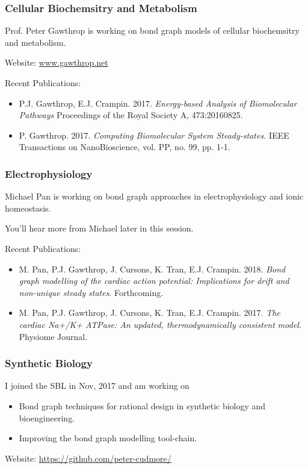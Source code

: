 \documentclass[11pt,reqno]{beamer}
\begin{document}
\begin{frame}
\frametitle{Cellular Biochemsitry and Metabolism}

Prof. Peter Gawthrop is working on bond graph models of cellular biochemsitry and metabolism.\\
\vspace{10pt}

Website: \url{www.gawthrop.net}
\vspace{10pt}

Recent Publications:
\begin{itemize}
	\itemsep1em
	\item  P.J. Gawthrop, E.J. Crampin. 2017. \emph{Energy-based Analysis of Biomolecular Pathways}
	Proceedings of the Royal Society A, 473:20160825.
	\item P. Gawthrop. 2017. \emph{Computing Biomolecular System Steady-states.}
	 IEEE Transactions on NanoBioscience, vol. PP, no. 99, pp. 1-1. 
\end{itemize}


\end{frame}
\begin{frame}
\frametitle{Electrophysiology}
Michael Pan is working on bond graph approaches in electrophysiology and ionic homeostasis. \\
\vspace{10pt}

You'll hear more from Michael later in this session.\\
\vspace{10pt}

Recent Publications:
\begin{itemize}
	\itemsep1em
	\item M. Pan, P.J. Gawthrop, J. Cursons, K. Tran, E.J. Crampin. 2018. \emph{Bond graph modelling of the cardiac action potential: Implications for drift and non-unique steady states}. Forthcoming.
	\item M. Pan, P.J. Gawthrop, J. Cursons, K. Tran, E.J. Crampin. 2017.
	\emph{The cardiac Na+/K+ ATPase: An updated, thermodynamically consistent model}.
	Physiome Journal.
\end{itemize}
\end{frame}
\begin{frame}
\frametitle{Synthetic Biology}
I joined the SBL in Nov, 2017 and am working on
\begin{itemize}
	\itemsep1em
	\item Bond graph techniques for rational design in synthetic biology and bioengineering.
	\item Improving the bond graph modelling tool-chain. 
\end{itemize}
\vspace{10pt}


Website: \url{https://github.com/peter-cudmore/}

\end{frame}
\end{document}

